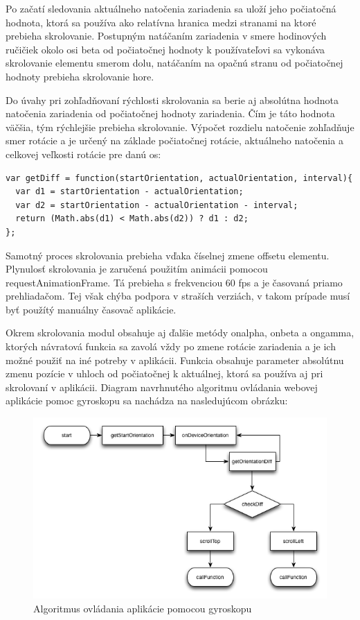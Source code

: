 Po začatí sledovania aktuálneho natočenia zariadenia sa uloží jeho počiatočná hodnota, ktorá sa používa ako relatívna hranica medzi stranami na ktoré prebieha skrolovanie. Postupným natáčaním zariadenia v smere hodinových ručičiek okolo osi beta od počiatočnej hodnoty k používateľovi sa vykonáva skrolovanie elementu smerom dolu, natáčaním na opačnú stranu od počiatočnej hodnoty prebieha skrolovanie hore.

Do úvahy pri zohľadňovaní rýchlosti skrolovania sa berie aj absolútna hodnota natočenia zariadenia od počiatočnej hodnoty zariadenia. Čím je táto hodnota väčšia, tým rýchlejšie prebieha skrolovanie. Výpočet rozdielu natočenie zohľadňuje smer rotácie a je určený na základe počiatočnej rotácie, aktuálneho natočenia a celkovej veľkosti rotácie pre danú os:

\begin{lstlisting}
var getDiff = function(startOrientation, actualOrientation, interval){
  var d1 = startOrientation - actualOrientation;
  var d2 = startOrientation - actualOrientation - interval;
  return (Math.abs(d1) < Math.abs(d2)) ? d1 : d2;
};
\end{lstlisting}

Samotný proces skrolovania prebieha vďaka číselnej zmene offsetu elementu. Plynulosť skrolovania je zaručená použitím animácii pomocou requestAnimationFrame. Tá prebieha s frekvenciou 60 fps a je časovaná priamo prehliadačom. Tej však chýba podpora v straších verziách, v takom prípade musí byť použítý manuálny časovač aplikácie.

Okrem skrolovania modul obsahuje aj ďalšie metódy onalpha, onbeta a ongamma, ktorých návratová funkcia sa zavolá vždy po zmene rotácie zariadenia a je ich možné použiť na iné potreby v aplikácii. Funkcia obsahuje parameter absolútnu zmenu pozície v uhloch od počiatočnej k aktuálnej, ktorá sa používa aj pri skrolovaní v aplikácii. Diagram navrhnutého algoritmu ovládania webovej aplikácie pomoc gyroskopu sa nachádza na nasledujúcom obrázku:

\begin{figure}[H]
  \centering
  \includegraphics[width=1.0\textwidth]{diagram/scroll.png}
  \caption[Algoritmus ovládania aplikácie pomocou gyroskopu]{
    Algoritmus ovládania aplikácie pomocou gyroskopu}
  \label{fig: diascroll}
\end{figure}

